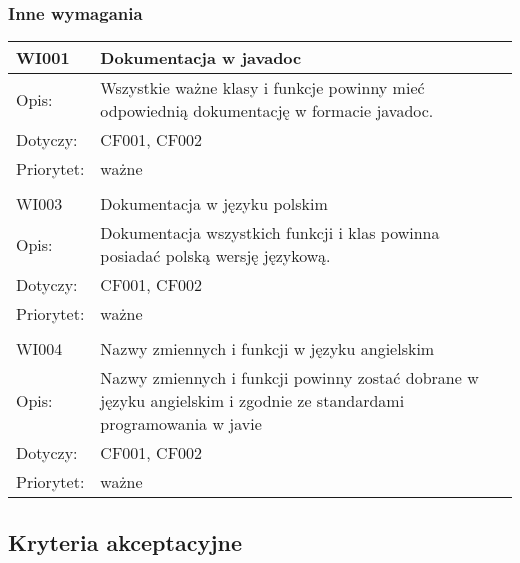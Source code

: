 \subsubsection{Inne wymagania}

\begin{center}

\begin{tabular}{|m{3cm}|m{9cm}|} \hline

WI001 & Dokumentacja w javadoc \\ \hline
Opis: & Wszystkie ważne klasy i funkcje powinny mieć odpowiednią dokumentację w formacie javadoc.\\ \hline
Dotyczy: & CF001, CF002 \\ \hline
Priorytet: & ważne \\ \hline


\multicolumn{2}{c}{} \\
 \hline

WI003 & Dokumentacja w języku polskim \\ \hline
Opis: & Dokumentacja wszystkich funkcji i klas powinna posiadać polską wersję językową. \\ \hline
Dotyczy: & CF001, CF002 \\ \hline
Priorytet: & ważne \\ \hline

\multicolumn{2}{c}{} \\
 \hline
WI004 & Nazwy zmiennych i funkcji w języku angielskim \\ \hline
Opis: & Nazwy zmiennych i funkcji powinny zostać dobrane w języku angielskim i zgodnie ze standardami programowania w javie %
\\ \hline
Dotyczy: & CF001, CF002 \\ \hline
Priorytet: & ważne \\ \hline

\end{tabular}

\end{center}

\subsection{Kryteria akceptacyjne}


